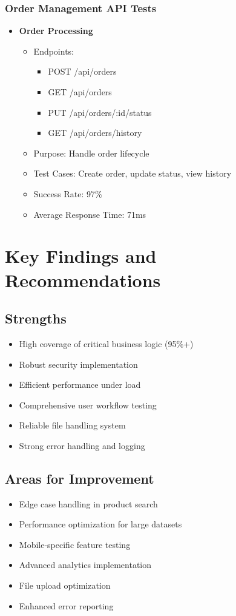 \subsubsection{Order Management API Tests}
\begin{itemize}
    \item \textbf{Order Processing}
    \begin{itemize}
        \item Endpoints:
        \begin{itemize}
            \item POST /api/orders
            \item GET /api/orders
            \item PUT /api/orders/:id/status
            \item GET /api/orders/history
        \end{itemize}
        \item Purpose: Handle order lifecycle
        \item Test Cases: Create order, update status, view history
        \item Success Rate: 97\%
        \item Average Response Time: 71ms
    \end{itemize}
\end{itemize}


\section{Key Findings and Recommendations}
\subsection{Strengths}
\begin{itemize}
    \item High coverage of critical business logic (95\%+)
    \item Robust security implementation
    \item Efficient performance under load
    \item Comprehensive user workflow testing
    \item Reliable file handling system
    \item Strong error handling and logging
\end{itemize}

\subsection{Areas for Improvement}
\begin{itemize}
    \item Edge case handling in product search
    \item Performance optimization for large datasets
    \item Mobile-specific feature testing
    \item Advanced analytics implementation
    \item File upload optimization
    \item Enhanced error reporting
\end{itemize}


